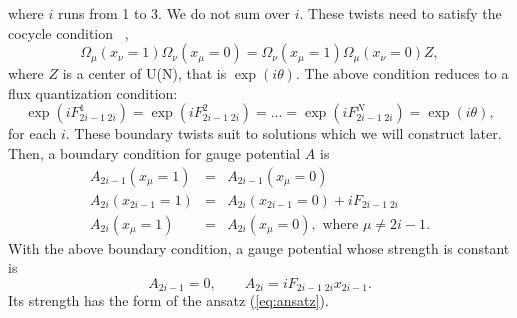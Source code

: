 \documentclass[a4paper,12pt]{article}
\begin{document}
where $i$ runs from 1 to 3. We do not sum over $i$. These twists need to satisfy the cocycle condition ~\cite{thooft},
\[\Omega_{\mu}(x_{\nu}=1)\Omega_{\nu}(x_{\mu}=0) = \Omega_{\nu}(x_{\mu}=1)\Omega_{\mu}(x_{\nu}=0) Z, \]
where $Z$ is a center of U(N), that is $ \exp(i\theta). $
The above condition reduces to a flux quantization condition:
\begin{equation}
\exp(iF^1_{2i-1 \; 2i}) = \exp(iF^2_{2i-1 \; 2i}) = \ldots = \exp(iF^N_{2i-1 \; 2i}) = \exp(i\theta), \label{eq:fluxquantize}
\end{equation}
for each $i$. These boundary twists suit to solutions which we will construct later. Then, a boundary condition for gauge potential $ A $ is
\begin{eqnarray*}
A_{2i-1}(x_\mu = 1) &=& A_{2i-1}(x_\mu = 0) \\
A_{2i}(x_{2i-1} = 1) &=& A_{2i}(x_{2i-1} = 0) + iF_{2i-1 \; 2i} \\
A_{2i}(x_\mu = 1) &=& A_{2i}(x_\mu = 0), \mbox{ where } \mu \neq 2i-1.  
\end{eqnarray*}
With the above boundary condition, a gauge potential whose strength is constant is
\[A_{2i-1} = 0, \qquad  A_{2i} = i F_{2i-1 \; 2i}x_{2i-1}. \]
Its strength has the form of the ansatz (\ref{eq:ansatz}).
\end{document}
